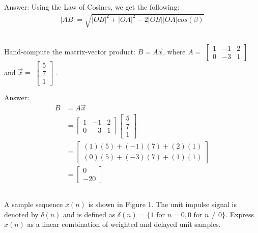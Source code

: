 \documentclass[12pt]{article}
\begin{document}
\color{blue}
Answer: Using the Law of Cosines, we get the following:
\begin{align*}
|AB| = \sqrt{|OB|^2 + |OA|^2 - 2|OB||OA|cos(\beta)}
\end{align*}

\color{black}
\subsection{}
Hand-compute the matrix-vector product: $B = A\vec{x}$, where $A = $
$\begin{bmatrix}
    1 & -1 & 2 \\
    0 & -3 & 1
\end{bmatrix}$
and $\vec{x} = $
$\begin{bmatrix}
    5 \\
    7 \\
    1
\end{bmatrix}$
.

\color{blue}
Answer:
\begin{align*}
    B &= A\vec{x} \\
    &=
    \begin{bmatrix}
        1 & -1 & 2 \\
        0 & -3 & 1
    \end{bmatrix}
    \begin{bmatrix}
        5 \\
        7 \\
        1
    \end{bmatrix} \\
    &=
    \begin{bmatrix}
        (1)(5) + (-1)(7) + (2)(1) \\
        (0)(5) + (-3)(7) + (1)(1)
    \end{bmatrix} \\\
    &=
    \begin{bmatrix}
        0 \\
        -20
    \end{bmatrix}
\end{align*}

\color{black}
\subsection{}
A sample sequence $x(n)$ is shown in Figure 1. The unit impulse signal is denoted by $\delta(n)$ and is defined as $\delta(n) = \lbrace 1 \text{ for } n = 0, 0 \text{ for } n \neq 0 \rbrace $. Express $x(n)$ as a linear combination of weighted and delayed unit samples.
\end{document}
